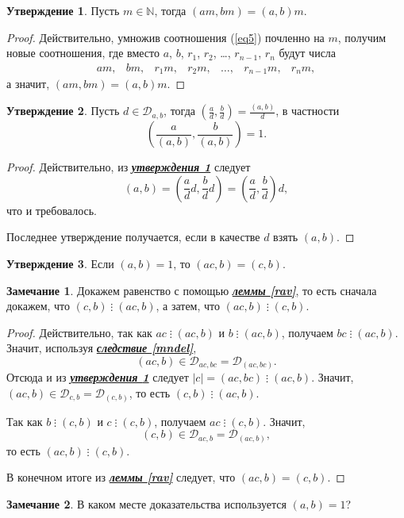 \documentclass[14pt, a4paper]{extarticle}
\theoremstyle{definition}
\newtheorem*{remark}{Замечание}
\newtheorem{statement}{Утверждение}
\newcommand{\divisible}{\mathop{\vdots}}
\begin{document}
	\begin{statement}
	\label{vyn}
		Пусть $m\in\mathbb{N}$, тогда $(am,bm)=(a,b)m$.
	\end{statement}
	\begin{proof}
		Действительно, умножив соотношения (\ref{eq5}) почленно на $m$, получим новые соотношения, где вместо $a$, $b$, $r_1$, $r_2$, \dots, $r_{n-1}$, $r_n$ будут числа
		$$\begin{array}{ccccccc}
			am,&bm,&r_1m,&r_2m,&\dots,&r_{n-1}m,&r_nm,
		\end{array}$$
		а значит, $(am,bm)=(a,b)m$.
	\end{proof}

	\begin{statement}
	\label{delpr}
		Пусть $d\in\mathcal{D}_{a,b}$, тогда $\left(\frac{a}{d},\frac{b}{d}\right)=\frac{(a,b)}{d}$, в частности $$\boxed{\left(\frac{a}{(a,b)},\frac{b}{(a,b)}\right)=1.}$$
	\end{statement}
	\begin{proof}
		Действительно, из \hyperref[vyn]{\textbf{\textit{утверждения \ref*{vyn}}}} следует $$(a,b)=\left(\frac{a}{d}d,\frac{b}{d}d\right)=\left(\frac{a}{d},\frac{b}{d}\right)d,$$ что и требовалось.
		
		Последнее утверждение получается, если в качестве $d$ взять $(a,b)$.
	\end{proof}

	\begin{statement}
	\label{vzpr}
		Если $(a,b)=1$, то $(ac,b)=(c,b)$.
	\end{statement}
	\begin{remark}
		Докажем равенство с помощью \hyperref[rav]{\textbf{\textit{леммы \ref*{rav}}}}, то есть сначала докажем, что $(c,b)\divisible(ac,b)$, а затем, что $(ac,b)\divisible(c,b)$.
	\end{remark}
	\begin{proof}
		Действительно, так как $ac\divisible(ac,b)$ и $b\divisible(ac,b)$, получаем $bc\divisible(ac,b)$. Значит, используя \hyperref[mndel]{\textbf{\textit{следствие \ref*{mndel}}}}, $$(ac,b)\in\mathcal{D}_{ac,bc}=\mathcal{D}_{(ac,bc)}.$$ Отсюда и из \hyperref[vyn]{\textbf{\textit{утверждения \ref*{vyn}}}} следует $|c|=(ac,bc)\divisible(ac,b)$. Значит, $(ac,b)\in\mathcal{D}_{c,b}=\mathcal{D}_{(c,b)}$, то есть $(c,b)\divisible(ac,b)$.
		
		Так как $b\divisible(c,b)$ и $c\divisible(c,b)$, получаем $ac\divisible(c,b)$. Значит, $$(c,b)\in\mathcal{D}_{ac,b}=\mathcal{D}_{(ac,b)},$$ то есть $(ac,b)\divisible(c,b)$.
		
		В конечном итоге из \hyperref[rav]{\textbf{\textit{леммы \ref*{rav}}}} следует, что $(ac,b)=(c,b)$.
	\end{proof}
	\begin{remark}
		В каком месте доказательства используется $(a,b)=1$?
	\end{remark}
\end{document}
